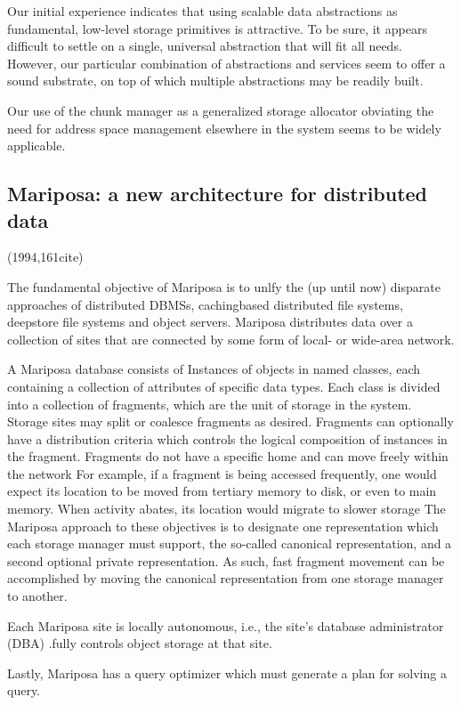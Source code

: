 \documentclass[a4paper,twoside]{scrbook}
\begin{document}
Our initial experience indicates that using scalable data abstractions as fundamental, low-level storage primitives is attractive. To be sure, it appears difficult to settle on a single, universal abstraction that will fit all needs. However, our particular combination of abstractions and services seem to offer a sound substrate, on top of which multiple abstractions may be readily built.

Our use of the chunk manager as a generalized storage allocator obviating the need for address space management elsewhere in the system seems to be widely applicable. 
\subsection{Mariposa: a new architecture for distributed data\cite{stonebraker1994mariposa}}
(1994,161cite)\par
The fundamental objective of Mariposa is to unlfy the (up until now) disparate approaches of distributed DBMSs, cachingbased distributed file systems, deepstore file systems and object servers. Mariposa distributes data over a collection of sites that are connected by some form of local- or wide-area network.

A Mariposa database consists of Instances of objects in named classes, each containing a collection of attributes of specific data types.
Each class is divided into a collection of fragments, which are the unit of storage in the system. Storage sites may split or coalesce fragments as desired. Fragments can optionally have a distribution criteria which controls the logical composition of instances in the fragment. Fragments do not have a specific home and can move freely within the network
For example, if a fragment is being accessed frequently, one would expect its location to be moved from tertiary memory to disk, or even to main memory. When activity abates, its location would migrate to slower storage
The Mariposa approach to these objectives is to designate one representation which each storage manager must support, the so-called canonical representation, and a second optional private representation. As such, fast fragment movement can be accomplished by moving the canonical representation from one storage manager to another.

Each Mariposa site is locally autonomous, i.e., the site’s database administrator (DBA) .fully controls object storage at that site.

Lastly, Mariposa has a query optimizer which must generate a plan for solving a query.
\end{document}
